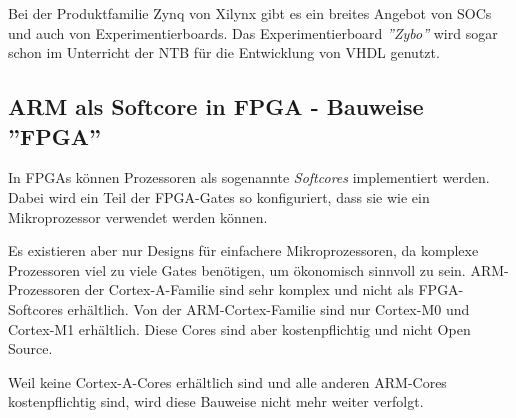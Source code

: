 Bei der Produktfamilie Zynq von Xilynx gibt es ein breites Angebot von SOCs und auch von Experimentierboards.
Das Experimentierboard \textit{''Zybo''} wird sogar schon im Unterricht der NTB für die Entwicklung von VHDL genutzt.


\subsection{ARM als Softcore in FPGA - Bauweise ''FPGA''}
In FPGAs können Prozessoren als sogenannte \textit{Softcores} implementiert werden.
Dabei wird ein Teil der FPGA-Gates so konfiguriert, dass sie wie ein Mikroprozessor verwendet werden können.

Es existieren aber nur Designs für einfachere Mikroprozessoren, da komplexe Prozessoren viel zu viele Gates benötigen, um ökonomisch sinnvoll zu sein.
ARM-Prozessoren der Cortex-A-Familie sind sehr komplex und nicht als FPGA-Softcores erhältlich.
Von der ARM-Cortex-Familie sind nur Cortex-M0 und Cortex-M1 erhältlich.
Diese Cores sind aber kostenpflichtig und nicht Open Source.

Weil keine Cortex-A-Cores erhältlich sind und alle anderen ARM-Cores kostenpflichtig sind, wird diese Bauweise nicht mehr weiter verfolgt.



